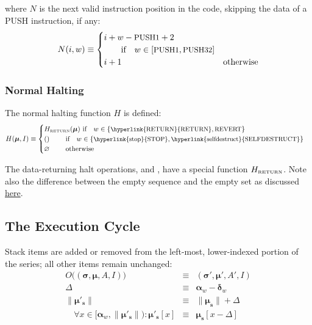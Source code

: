 \documentclass[9pt,oneside]{amsart}
\makeatletter
\newcommand{\linkdest}[1]{\Hy@raisedlink{\hypertarget{#1}{}}}
\makeatother
\begin{document}
\begin{multicols}{2}
where $N$ is the next valid instruction position in the code, skipping the data of a {\small PUSH} instruction, if any:
\begin{equation}
N(i, w) \equiv \begin{cases}
i + w - \text{\small PUSH1} + 2 & \\
\quad\quad\text{if} \quad w \in [\text{\small PUSH1}, \text{\small PUSH32}] \\
i + 1 & \text{otherwise} \end{cases}
\end{equation}

\subsubsection{Normal Halting}\hypertarget{normal_halting_function_H}{}\linkdest{hhalt}

The normal halting function $H$ is defined:
\begin{equation}
H(\boldsymbol{\mu}, I) \equiv \begin{cases}
H_{\text{\tiny RETURN}}(\boldsymbol{\mu}) \ \text{if} \quad w \in \{\text{\small \hyperlink{RETURN}{RETURN}}, \text{\small REVERT}\} &\\
() \quad\quad\ \text{if} \quad w \in \{ \text{\small \hyperlink{stop}{STOP}}, \text{\small \hyperlink{selfdestruct}{SELFDESTRUCT}} \} &\\
\varnothing \quad\quad\ \text{otherwise}&
\end{cases}
\end{equation}

The data-returning halt operations, \hyperlink{RETURN}{} and , have a special function $H_{\text{\tiny RETURN}}$. Note also the difference between the empty sequence and the empty set as discussed \hyperlink{empty_sequence_vs_empty_set}{here}.

\subsection{The Execution Cycle}

Stack items are added or removed from the left-most, lower-indexed portion of the series; all other items remain unchanged:
\begin{eqnarray}
O\big((\boldsymbol{\sigma}, \boldsymbol{\mu}, A, I)\big) & \equiv & (\boldsymbol{\sigma}', \boldsymbol{\mu}', A', I) \\
\Delta & \equiv & \mathbf{\alpha}_{w} - \mathbf{\delta}_{w} \\
\lVert\boldsymbol{\mu}'_{\mathbf{s}}\rVert & \equiv & \lVert\boldsymbol{\mu}_{\mathbf{s}}\rVert + \Delta \\
\quad \forall x \in [\mathbf{\alpha}_{w}, \lVert\boldsymbol{\mu}'_{\mathbf{s}}\rVert): \boldsymbol{\mu}'_{\mathbf{s}}[x] & \equiv & \boldsymbol{\mu}_{\mathbf{s}}[x-\Delta]
\end{eqnarray}


\end{multicols}
\end{document}
